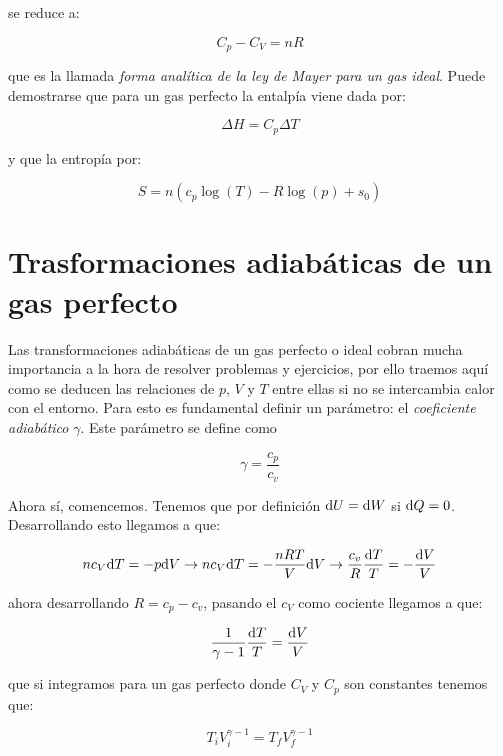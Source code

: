 \documentclass[12pt]{book}
\begin{document}
se reduce a:

\begin{equation}
C_p - C_V = nR
\end{equation}

que es la llamada \textit{forma analítica de la ley de Mayer para un gas ideal}. Puede demostrarse que para un gas perfecto la entalpía viene dada por:

\begin{equation}
\Delta H = C_p \Delta T
\end{equation}

y que la entropía por:

\begin{equation}
S = n (c_p \log (T) - R \log (p) + s_0)
\end{equation}

\section{Trasformaciones adiabáticas de un gas perfecto}

Las transformaciones adiabáticas de un gas perfecto o ideal cobran mucha importancia a la hora de resolver problemas y ejercicios, por ello traemos aquí como se deducen las relaciones de $p$, $V$ y $T$ entre ellas si no se intercambia calor con el entorno. Para esto es fundamental definir un parámetro: el \textit{coeficiente adiabático} $\gamma$. Este parámetro se define como

 \begin{equation}
\gamma = \frac{c_p}{c_v}
\end{equation}

Ahora sí, comencemos. Tenemos que por definición $\mathrm{d} U = \mathrm{d} W$ si $\mathrm{d} Q = 0$. Desarrollando esto llegamos a que:

$$
n c_V \mathrm{d} T = - p \mathrm{d} V \rightarrow n c_V \mathrm{d} T = - \dfrac{nRT}{V} \mathrm{d} V \rightarrow \dfrac{c_v}{R} \dfrac{\mathrm{d} T}{T} = - \dfrac{\mathrm{d} V}{V}
$$

ahora desarrollando $R=c_p - c_v $, pasando el $c_V$ como cociente llegamos a que:

\begin{equation}
\dfrac{1}{\gamma -1} \dfrac{\mathrm{d} T}{T} = \dfrac{\mathrm{d} V}{V}
\end{equation}


que si integramos para un gas perfecto donde $C_V$ y $C_p$ son constantes tenemos que:

\begin{equation}
T_i V_i^{\gamma-1} = T_f V_f^{\gamma-1} 
\end{equation}
\end{document}
